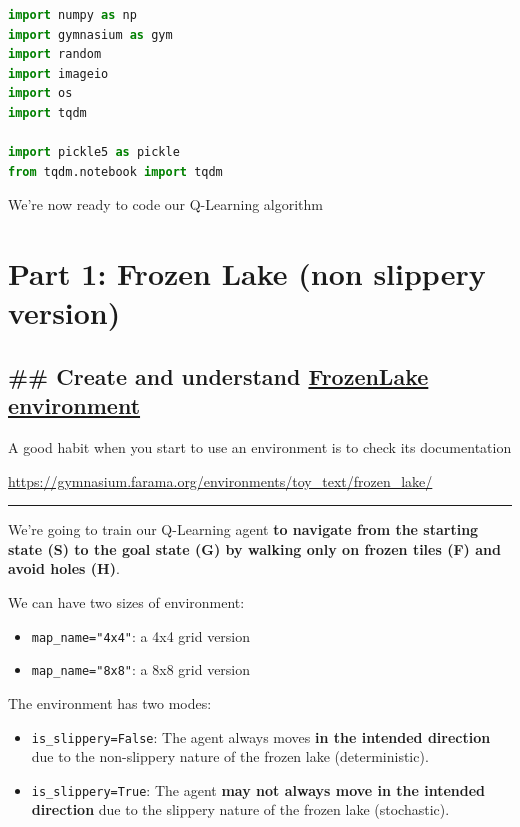 \documentclass[11pt,a4paper]{article}
\begin{document}
\begin{lstlisting}[language=Python]
import numpy as np
import gymnasium as gym
import random
import imageio
import os
import tqdm

import pickle5 as pickle
from tqdm.notebook import tqdm
\end{lstlisting}

We're now ready to code our Q-Learning algorithm

\section{Part 1: Frozen Lake (non slippery version)}\label{part-1-frozen-lake-non-slippery-version}

\subsection{\texorpdfstring{\#\# Create and understand \href{https://gymnasium.farama.org/environments/toy_text/frozen_lake/}{FrozenLake environment}}{\#\# Create and understand FrozenLake environment}}\label{create-and-understand-frozenlake-environment}

A good habit when you start to use an environment is to check its documentation

\url{https://gymnasium.farama.org/environments/toy_text/frozen_lake/}

\begin{center}\rule{0.5\linewidth}{0.5pt}\end{center}

We're going to train our Q-Learning agent \textbf{to navigate from the starting state (S) to the goal state (G) by walking only on frozen tiles (F) and avoid holes (H)}.

We can have two sizes of environment:

\begin{itemize}
\tightlist
\item
  \passthrough{\lstinline!map_name="4x4"!}: a 4x4 grid version
\item
  \passthrough{\lstinline!map_name="8x8"!}: a 8x8 grid version
\end{itemize}

The environment has two modes:

\begin{itemize}
\tightlist
\item
  \passthrough{\lstinline!is_slippery=False!}: The agent always moves \textbf{in the intended direction} due to the non-slippery nature of the frozen lake (deterministic).
\item
  \passthrough{\lstinline!is_slippery=True!}: The agent \textbf{may not always move in the intended direction} due to the slippery nature of the frozen lake (stochastic).
\end{itemize}
\end{document}
